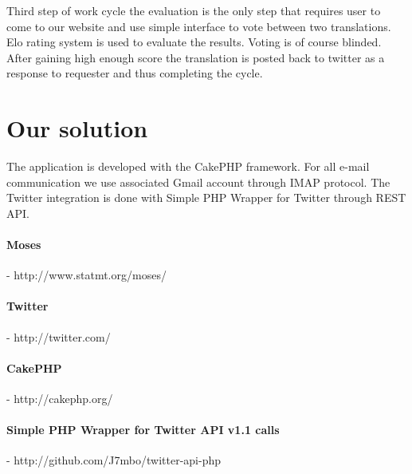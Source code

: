 Third step of work cycle the evaluation is the only step that requires user to
come to our website and use simple interface to vote between two translations.
Elo rating system is used to evaluate the results. Voting is of course blinded.
After gaining high enough score the translation is posted back to twitter as a
response to requester and thus completing the cycle. 

\section{Our solution}

The application is developed with the CakePHP framework. For all e-mail
communication we use associated Gmail account through IMAP protocol. The Twitter
integration is done with Simple PHP Wrapper for Twitter through REST API.


 

\paragraph{Moses} - http://www.statmt.org/moses/
\paragraph{Twitter} - http://twitter.com/
\paragraph{CakePHP} - http://cakephp.org/
\paragraph{Simple PHP Wrapper for Twitter API v1.1 calls} - http://github.com/J7mbo/twitter-api-php

 

